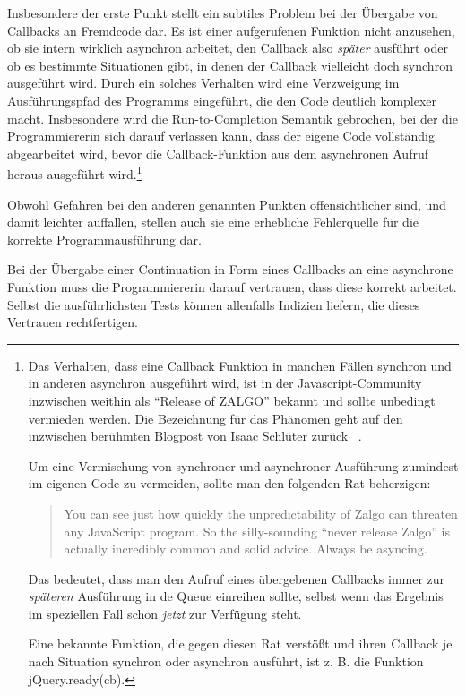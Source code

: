 \documentclass[
11pt, %
a4paper, %
oneside, %
pdfspacing, %
headinclude,
BCOR5mm, %
ngerman, %
bibtotocnumbered,
]{scrartcl}
\begin{document}
	Insbesondere der erste Punkt stellt ein subtiles Problem bei der Übergabe von Callbacks an Fremdcode dar. Es ist einer aufgerufenen Funktion nicht anzusehen, ob sie intern wirklich asynchron arbeitet, den Callback also \textit{später} ausführt oder ob es bestimmte Situationen gibt, in denen der Callback vielleicht doch synchron ausgeführt wird. Durch ein solches Verhalten wird eine Verzweigung im Ausführungspfad des Programms eingeführt, die den Code deutlich komplexer macht. Insbesondere wird die Run-to-Completion Semantik gebrochen, bei der die Programmiererin sich darauf verlassen kann, dass der eigene \-\-Code vollständig abgearbeitet wird, bevor die Callback-Funktion aus dem asynchronen Aufruf heraus ausgeführt wird.\footnote
	{
		Das Verhalten, dass eine Callback Funktion in manchen Fällen synchron und in anderen asynchron ausgeführt wird, ist in der Javascript-Community inzwischen weithin als "`Release of ZALGO"' bekannt und sollte unbedingt vermieden werden. Die Bezeichnung für das Phänomen geht auf den inzwischen berühmten Blogpost von Isaac Schlüter zurück ~\citep{Schlueter.2013}. 
		
		Um eine Vermischung von synchroner und asynchroner Ausführung zumindest im eigenen \-Code zu vermeiden, sollte man den folgenden Rat beherzigen: 
		
		\begin{quote}
			You can see just how quickly the unpredictability of Zalgo can threaten any JavaScript program. So the silly-sounding "`never release Zalgo"' is actually incredibly common and solid advice. Always be asyncing.~\citep[S.~37]{Simpson.2015}
		\end{quote}
		Das bedeutet, dass man den Aufruf eines übergebenen Callbacks immer zur \emph{späteren} Ausführung in de Queue einreihen sollte, selbst wenn das Ergebnis im speziellen Fall schon \emph{jetzt} zur Verfügung steht.
		
		Eine bekannte Funktion, die gegen diesen Rat verstößt und ihren Callback je nach Situation synchron oder asynchron ausführt, ist z. B. die Funktion \textsf{jQuery.ready(cb)}.
	}

	Obwohl Gefahren bei den anderen genannten Punkten offensichtlicher sind, und damit leichter auffallen, stellen auch sie eine erhebliche Fehlerquelle für die korrekte Programmausführung dar. 
	
	Bei der Übergabe einer Continuation in Form eines Callbacks an eine asynchrone Funktion muss die Programmiererin darauf vertrauen, dass diese korrekt arbeitet. Selbst die ausführlichsten Tests können allenfalls Indizien liefern, die dieses Vertrauen rechtfertigen. 
	
\end{document}
